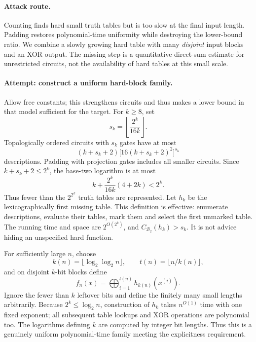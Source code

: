 \documentclass[11pt,a4paper]{article}
\numberwithin{equation}{section}
\begin{document}
\paragraph{Attack route.}
Counting finds hard small truth tables but is too slow at the final input
length. Padding restores polynomial-time uniformity while destroying the
lower-bound ratio. We combine a slowly growing hard table with many
\emph{disjoint} input blocks and an XOR output. The missing step is a
quantitative direct-sum estimate for unrestricted circuits, not the
availability of hard tables at this small scale.

\paragraph{Attempt: construct a uniform hard-block family.}
Allow free constants; this strengthens circuits and thus makes a lower bound
in that model sufficient for the target. For $k\ge8$, set
\[
 s_k=\left\lfloor\frac{2^k}{16k}\right\rfloor.
\]
Topologically ordered circuits with $s_k$ gates have at most
\begin{equation}\label{statement:count}
 (k+s_k+2)\bigl[16(k+s_k+2)^2\bigr]^{s_k}
\end{equation}
descriptions. Padding with projection gates includes all smaller circuits.
Since $k+s_k+2\le2^k$, the base-two logarithm is at most
\[
 k+\frac{2^k}{16k}(4+2k)<2^k.
\]
Thus fewer than the $2^{2^k}$ truth tables are represented. Let $h_k$ be
the lexicographically first missing table. This definition is effective:
enumerate descriptions, evaluate their tables, mark them and select the
first unmarked table. The running time and space are $2^{O(2^k)}$, and
$C_{\mathcal B_2}(h_k)>s_k$. It is not advice hiding an unspecified hard
function.

For sufficiently large $n$, choose
\[
 k(n)=\lfloor\log_2\log_2n\rfloor,
 \qquad t(n)=\lfloor n/k(n)\rfloor,
\]
and on disjoint $k$-bit blocks define
\begin{equation}\label{statement:family}
 f_n(x)=\bigoplus_{i=1}^{t(n)}h_{k(n)}(x^{(i)}).
\end{equation}
Ignore the fewer than $k$ leftover bits and define the finitely many small
lengths arbitrarily. Because $2^k\le\log_2n$, construction of $h_k$ takes
$n^{O(1)}$ time with one fixed exponent; all subsequent table lookups and
XOR operations are polynomial too. The logarithms defining $k$ are computed
by integer bit lengths. Thus this is a genuinely uniform polynomial-time
family meeting the explicitness requirement.
\end{document}
